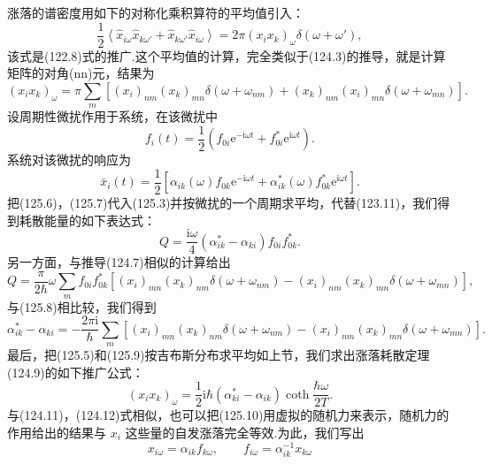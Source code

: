涨落的谱密度用如下的对称化乘积算符的平均值引入：
\begin{equation}
  \frac{1}{2}\left\langle\hat{x}_{i\omega}\hat{x}_{k\omega'}
  +\hat{x}_{k\omega'}\hat{x}_{i\omega}\right\rangle
  =2\pi(x_ix_k)_\omega\delta(\omega+\omega'),
\end{equation}
该式是(122.8)式的推广.这个平均值的计算，完全类似于(124.3)的推导，就是计算矩阵的对角(nn)元，结果为
\begin{equation}
  (x_ix_k)_\omega=\pi\sum_m\left[(x_i)_{nm}(x_k)_{mn}\delta(\omega+\omega_{nm})
  +(x_k)_{nm}(x_i)_{mn}\delta(\omega+\omega_{mn})\right].
\end{equation}
设周期性微扰作用于系统，在该微扰中
\begin{equation}
  f_i(t)=\frac{1}{2}\left(f_{0i}\mathrm{e}^{-\mathrm{i}\omega t}
  +f_{0i}^*\mathrm{e}^{\mathrm{i}\omega t}\right).
\end{equation}
系统对该微扰的响应为
\begin{equation}
  \bar{x}_i(t)=\frac{1}{2}\left[\alpha_{ik}(\omega)f_{0k}\mathrm{e}^{-\mathrm{i}\omega t}
  +\alpha_{ik}^*(\omega)f_{0k}^*\mathrm{e}^{\mathrm{i}\omega t}\right].
\end{equation}
把(125.6)，(125.7)代入(125.3)并按微扰的一个周期求平均，代替(123.11)，我们得到耗散能量的如下表达式：
\begin{equation}
  Q=\frac{\mathrm{i}\omega}{4}(\alpha_{ik}^*-\alpha_{ki})f_{0i}f_{0k}^*.
\end{equation}
另一方面，与推导(124.7)相似的计算给出
\begin{equation*}
  Q=\frac{\pi}{2\hbar}\omega\sum_m f_{0i}f_{0k}^*
  \left[(x_i)_{mn}(x_k)_{nm}\delta(\omega+\omega_{nm})
  -(x_i)_{nm}(x_k)_{mn}\delta(\omega+\omega_{mn})\right],
\end{equation*}
与(125.8)相比较，我们得到
\begin{equation}
  \alpha_{ik}^*-\alpha_{ki}=-\frac{2\pi\mathrm{i}}{\hbar}\sum_m
  \left[(x_i)_{mn}(x_k)_{nm}\delta(\omega+\omega_{nm})
  -(x_i)_{nm}(x_k)_{mn}\delta(\omega+\omega_{mn})\right].
\end{equation}
最后，把(125.5)和(125.9)按吉布斯分布求平均如上节，我们求出涨落耗散定理(124.9)的如下推广公式：
\begin{equation}
  (x_ix_k)_\omega=\frac{1}{2}\mathrm{i}\hbar(\alpha_{ki}^*-\alpha_{ik})
  \coth\frac{\hbar\omega}{2T}.
\end{equation}
与(124.11)，(124.12)式相似，也可以把(125.10)用虚拟的随机力来表示，随机力的作用给出的结果与 $x_i$ 这些量的自发涨落完全等效.为此，我们写出
\begin{equation}
  x_{i\omega}=\alpha_{ik}f_{k\omega},\qquad
  f_{i\omega}=\alpha^{-1}_{ik}x_{k\omega}
\end{equation}
